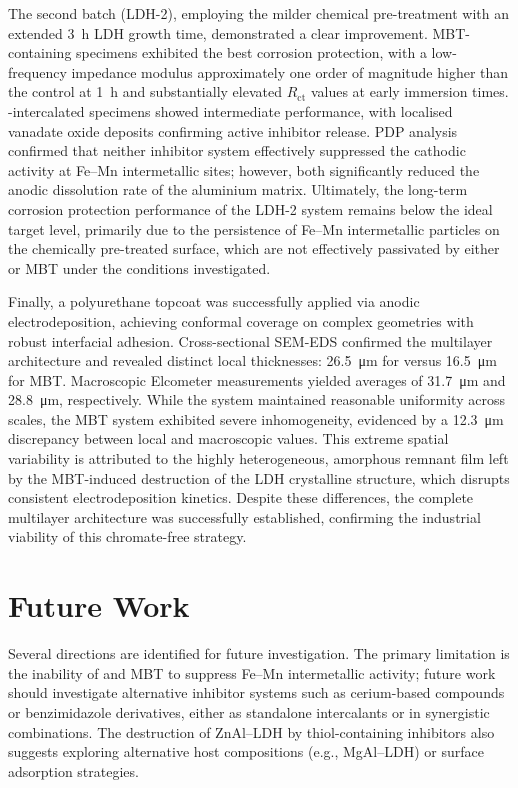 \documentclass[11pt,twoside,a4paper,final]{report}
\begin{document}
The second batch (LDH-2), employing the milder chemical pre-treatment with an extended \qty{3}{\hour} LDH growth time, demonstrated a clear improvement. MBT-containing specimens exhibited the best corrosion protection, with a low-frequency impedance modulus approximately one order of magnitude higher than the control at \qty{1}{\hour} and substantially elevated $R_{\text{ct}}$ values at early immersion times. -intercalated specimens showed intermediate performance, with localised vanadate oxide deposits confirming active inhibitor release. PDP analysis confirmed that neither inhibitor system effectively suppressed the cathodic activity at Fe--Mn intermetallic sites; however, both significantly reduced the anodic dissolution rate of the aluminium matrix. Ultimately, the long-term corrosion protection performance of the LDH-2 system remains below the ideal target level, primarily due to the persistence of Fe--Mn intermetallic particles on the chemically pre-treated surface, which are not effectively passivated by either  or MBT under the conditions investigated.

Finally, a polyurethane topcoat was successfully applied via anodic electrodeposition, achieving conformal coverage on complex geometries with robust interfacial adhesion. Cross-sectional SEM-EDS confirmed the multilayer architecture and revealed distinct local thicknesses: \qty{26.5}{\micro\meter} for  versus \qty{16.5}{\micro\meter} for MBT. Macroscopic Elcometer measurements yielded averages of \qty{31.7}{\micro\meter} and \qty{28.8}{\micro\meter}, respectively. While the  system maintained reasonable uniformity across scales, the MBT system exhibited severe inhomogeneity, evidenced by a \qty{12.3}{\micro\meter} discrepancy between local and macroscopic values. This extreme spatial variability is attributed to the highly heterogeneous, amorphous remnant film left by the MBT-induced destruction of the LDH crystalline structure, which disrupts consistent electrodeposition kinetics. Despite these differences, the complete multilayer architecture was successfully established, confirming the industrial viability of this chromate-free strategy.

\section{Future Work}

Several directions are identified for future investigation. The primary limitation is the inability of  and MBT to suppress Fe--Mn intermetallic activity; future work should investigate alternative inhibitor systems such as cerium-based compounds or benzimidazole derivatives, either as standalone intercalants or in synergistic combinations. The destruction of ZnAl--LDH by thiol-containing inhibitors also suggests exploring alternative host compositions (e.g., MgAl--LDH) or surface adsorption strategies.
\end{document}
